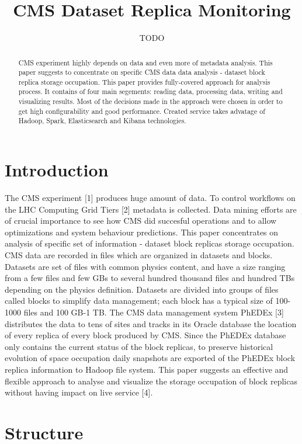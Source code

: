 \documentclass[a4paper]{jpconf}
\begin{document}
\title{CMS Dataset Replica Monitoring}

\author{TODO}

\address{TODO}


\begin{abstract}
CMS experiment highly depends on data and even more of metadata analysis. This paper suggests to concentrate on specific CMS data data analysis - dataset block replica storage occupation. 
This paper provides fully-covered approach for analysis process. It contains of four main segements: reading data, processing data, writing and visualizing results. Most of the decisions 
made in the approach were chosen in order to get high configurability and good performance. Created service takes advatage of Hadoop, Spark, Elasticsearch and Kibana technologies.
\end{abstract}

\section{Introduction}
The CMS experiment [1] produces huge amount of data. To control workflows on the LHC Computing Grid Tiers [2] metadata is collected. Data mining efforts are of crucial importance to see how 
CMS did succesful operations and to allow optimizations and system behaviour predictions. This paper concentrates on analysis of specific set of information - dataset block replicas 
storage occupation. CMS data are recorded in files which are organized in datasets and blocks. Datasets are set of files with common physics content, and have a size ranging from a 
few files and few GBs to several hundred thousand files and hundred TBs depending on the physics definition. Datasets are divided into groups of files called blocks to simplify data 
management; each block has a typical size of 100-1000 files and 100 GB-1 TB. The CMS data management system PhEDEx [3] distributes the data to tens of sites and tracks in its Oracle 
database the location of every replica of every block produced by CMS. Since the PhEDEx database only contains the current status of the block replicas, to preserve historical evolution 
of space occupation daily snapshots are exported of the PhEDEx block replica information to Hadoop file system. This paper suggests an effective and flexible approach to 
analyse and visualize the storage occupation of block replicas without having impact on live service [4].

\section{Structure}
\end{document}
